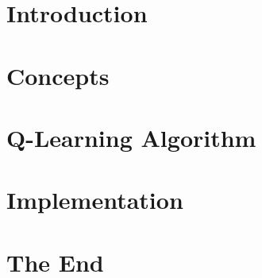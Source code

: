 \section[Intro]{Introduction}


\section[Concepts]{Concepts}


\section[Q-Learn]{Q-Learning Algorithm}



\section[Example]{Implementation}



\section[End]{The End}


